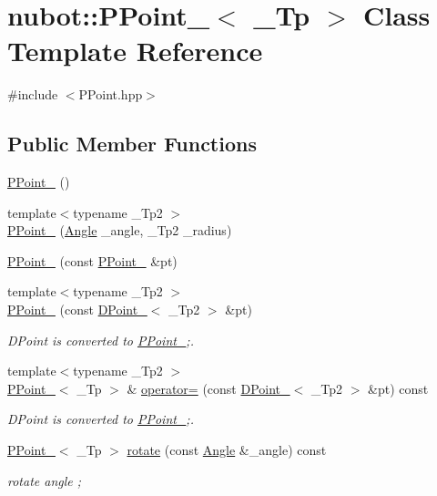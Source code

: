 \hypertarget{classnubot_1_1PPoint__}{\section{nubot\-:\-:P\-Point\-\_\-$<$ \-\_\-\-Tp $>$ Class Template Reference}
\label{classnubot_1_1PPoint__}
}


{\ttfamily \#include $<$P\-Point.\-hpp$>$}

\subsection*{Public Member Functions}
\begin{DoxyCompactItemize}
\item 
\hyperlink{classnubot_1_1PPoint___afd681e0f3b2e56ef18b5a51784505a77}{P\-Point\-\_\-} ()
\item 
{\footnotesize template$<$typename \-\_\-\-Tp2 $>$ }\\\hyperlink{classnubot_1_1PPoint___a69447da9da47428004b139bd471d03ea}{P\-Point\-\_\-} (\hyperlink{classnubot_1_1Angle}{Angle} \-\_\-angle, \-\_\-\-Tp2 \-\_\-radius)
\item 
\hyperlink{classnubot_1_1PPoint___a8229e4c0dc0f6ba79931fbfd9b7fda8b}{P\-Point\-\_\-} (const \hyperlink{classnubot_1_1PPoint__}{P\-Point\-\_\-} \&pt)
\item 
{\footnotesize template$<$typename \-\_\-\-Tp2 $>$ }\\\hyperlink{classnubot_1_1PPoint___ad4f90617722c3fe5cbaefa8b1b6949a1}{P\-Point\-\_\-} (const \hyperlink{classnubot_1_1DPoint__}{D\-Point\-\_\-}$<$ \-\_\-\-Tp2 $>$ \&pt)
\begin{DoxyCompactList}\small\item\em D\-Point is converted to \hyperlink{classnubot_1_1PPoint__}{P\-Point\-\_\-};. \end{DoxyCompactList}\item 
{\footnotesize template$<$typename \-\_\-\-Tp2 $>$ }\\\hyperlink{classnubot_1_1PPoint__}{P\-Point\-\_\-}$<$ \-\_\-\-Tp $>$ \& \hyperlink{classnubot_1_1PPoint___a5cf4ef5ffc29cedb9cbfc0b320762114}{operator=} (const \hyperlink{classnubot_1_1DPoint__}{D\-Point\-\_\-}$<$ \-\_\-\-Tp2 $>$ \&pt) const 
\begin{DoxyCompactList}\small\item\em D\-Point is converted to \hyperlink{classnubot_1_1PPoint__}{P\-Point\-\_\-};. \end{DoxyCompactList}\item 
\hyperlink{classnubot_1_1PPoint__}{P\-Point\-\_\-}$<$ \-\_\-\-Tp $>$ \hyperlink{classnubot_1_1PPoint___a2ec3ad40128260a055399badec661b68}{rotate} (const \hyperlink{classnubot_1_1Angle}{Angle} \&\-\_\-angle) const 
\begin{DoxyCompactList}\small\item\em rotate angle ; \end{DoxyCompactList}\end{DoxyCompactItemize}

